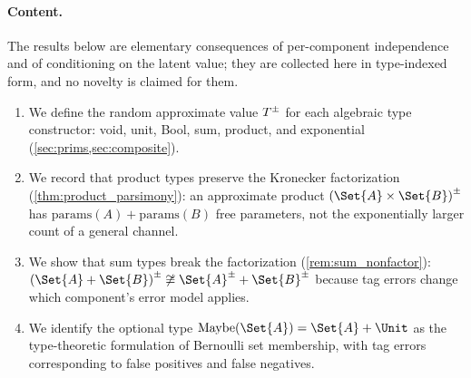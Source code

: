\documentclass[ ../main.tex]{subfiles}
\begin{document}
\paragraph{Content.}
The results below are elementary consequences of per-component independence and of conditioning on the latent value; they are collected here in type-indexed form, and no novelty is claimed for them.
\begin{enumerate}
\item We define the random approximate value $\AT{T}$ for each algebraic type constructor: void, unit, Bool, sum, product, and exponential (\cref{sec:prims,sec:composite}).

\item We record that product types preserve the Kronecker factorization (\cref{thm:product_parsimony}): an approximate product $\AT{(\Set{A} \times \Set{B})}$ has $\mathrm{params}(A) + \mathrm{params}(B)$ free parameters, not the exponentially larger count of a general channel.

\item We show that sum types break the factorization (\cref{rem:sum_nonfactor}): $\AT{(\Set{A} + \Set{B})} \not\cong \AT{\Set{A}} + \AT{\Set{B}}$ because tag errors change which component's error model applies.

\item We identify the optional type $\mathrm{Maybe}(\Set{A}) = \Set{A} + \Unit$ as the type-theoretic formulation of Bernoulli set membership, with tag errors corresponding to false positives and false negatives.
\end{enumerate}
\end{document}
